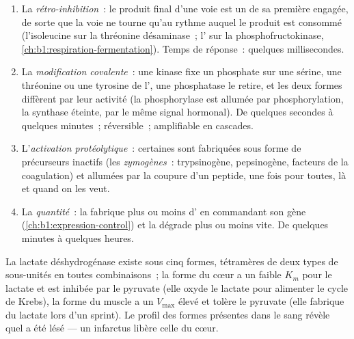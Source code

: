 \begin{proposition}\label{prop:b1:enzymes:control}
\begin{enumerate}
  \item La \emph{rétro-inhibition}~: le produit
        final d'une voie est un   de sa première
         engagée, de sorte que la voie ne tourne qu'au rythme
        auquel le produit est consommé (l'isoleucine sur la thréonine
        désaminase~; l' sur la phosphofructokinase,
        \cref{ch:b1:respiration-fermentation}). Temps de réponse~:
        quelques millisecondes.
  \item La \emph{modification covalente}~:
        une kinase fixe un phosphate sur une sérine, une thréonine ou
        une tyrosine de l', une phosphatase le retire, et les deux
        formes diffèrent par leur activité (la  phosphorylase
        est allumée par phosphorylation, la  synthase éteinte,
        par le même signal hormonal). De quelques secondes à quelques
        minutes~; réversible~; amplifiable en cascades.
  \item L'\emph{activation protéolytique}~: certaines  sont
        fabriquées sous forme de précurseurs inactifs (les
        \emph{zymogènes}~: trypsinogène, pepsinogène, facteurs de la
        coagulation) et allumées par la coupure d'un peptide, une fois
        pour toutes, là et quand on les veut.
  \item La \emph{quantité}~: la  fabrique plus ou moins d'
        en commandant son gène (\cref{ch:b1:expression-control}) et la
        dégrade plus ou moins vite. De quelques minutes à quelques
        heures.
\end{enumerate}
\end{proposition}

\begin{example}\label{ex:b1:enzymes:isoenzymes}
La lactate déshydrogénase existe sous cinq formes, tétramères de deux
types de sous-unités en toutes combinaisons~; la forme du cœur a un
faible $K_m$ pour le lactate et est inhibée par le pyruvate (elle oxyde
le lactate pour alimenter le cycle de Krebs), la forme du muscle a un
$V_{\max}$ élevé et tolère le pyruvate (elle fabrique du lactate lors
d'un sprint). Le profil des formes présentes dans le sang révèle quel
 a été lésé --- un infarctus libère celle du cœur.
\end{example}

